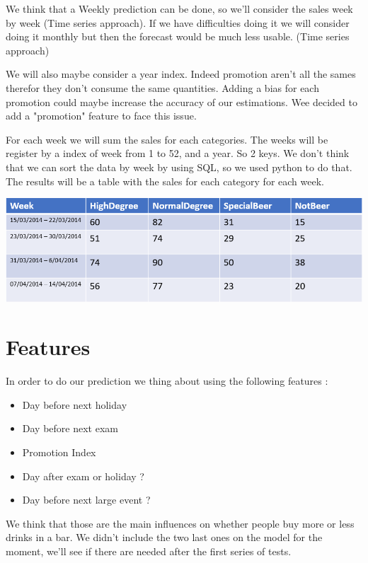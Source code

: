\documentclass{report}
\begin{document}
We think that a Weekly prediction can be done, so we'll consider the sales week by week (Time series approach). If we have difficulties doing it we will consider doing it monthly but then the forecast would be much less usable. (Time series approach)

We will also maybe consider a year index. Indeed promotion aren't all the sames therefor they don't consume the same quantities. Adding a bias for each promotion could maybe increase the accuracy of our estimations. Wee decided to add a "promotion" feature to face this issue.

For each week we will sum the sales for each categories. The weeks will be register by a index of week from 1 to 52, and a year. So 2 keys. 
We don't think that we can sort the data by week by using SQL, so we used python to do that. The results will be a table with the sales for each category for each week.

\vspace{5mm} 


\includegraphics[scale = 0.8]{FormatTable}

\section{Features}

In order to do our prediction we thing about using the following features :
\begin{itemize}
\item Day before next holiday 
\item Day before next exam
\item Promotion Index
\item Day after exam or holiday ?
\item Day before next large event ?
\end{itemize}

We think that those are the main influences on whether people buy more or less drinks in a bar. We didn't include the two last ones on the model for the moment, we'll see if there are needed after the first series of tests.
\end{document}
